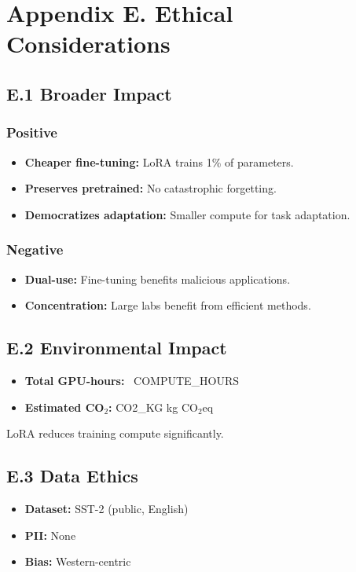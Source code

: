 
\section{Appendix E. Ethical Considerations}

\subsection{E.1 Broader Impact}

\subsubsection{Positive}
\begin{itemize}
\item \textbf{Cheaper fine-tuning:} LoRA trains 1\% of parameters.
\item \textbf{Preserves pretrained:} No catastrophic forgetting.
\item \textbf{Democratizes adaptation:} Smaller compute for task adaptation.

\end{itemize}
\subsubsection{Negative}
\begin{itemize}
\item \textbf{Dual-use:} Fine-tuning benefits malicious applications.
\item \textbf{Concentration:} Large labs benefit from efficient methods.

\end{itemize}
\subsection{E.2 Environmental Impact}

\begin{itemize}
\item \textbf{Total GPU-hours:} ~{{COMPUTE\_HOURS}}
\item \textbf{Estimated CO$_2$:} {{CO2\_KG}} kg CO$_2$eq

\end{itemize}
LoRA reduces training compute significantly.

\subsection{E.3 Data Ethics}

\begin{itemize}
\item \textbf{Dataset:} SST-2 (public, English)
\item \textbf{PII:} None
\item \textbf{Bias:} Western-centric

\end{itemize}
